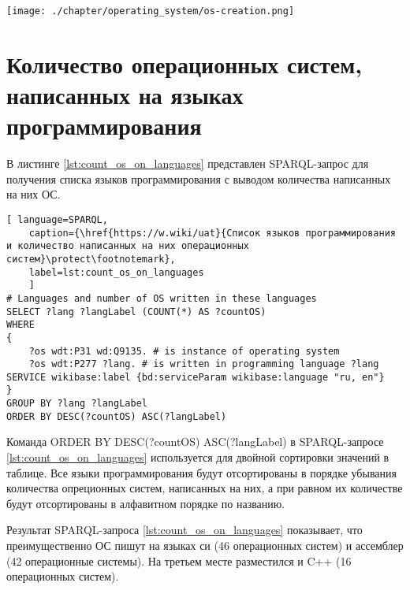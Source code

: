 \begin{figure*}[h!]
	\texttt{[image: ./chapter/operating\_system/os-creation.png]}
	\caption{Часть временной шкалы с датами выпуска операционных систем с 1955 по 2020 год.}
	\label{fig:os_creation}
\end{figure*}

\section{Количество операционных систем, написанных на языках программирования}
В листинге \ref{lst:count_os_on_languages} представлен SPARQL-запрос для получения списка языков программирования с выводом количества написанных на них ОС.


\begin{lstlisting}[ language=SPARQL, 
	caption={\href{https://w.wiki/uat}{Список языков программирования и количество написанных на них операционных систем}\protect\footnotemark},
	label=lst:count_os_on_languages
	]
# Languages and number of OS written in these languages
SELECT ?lang ?langLabel (COUNT(*) AS ?countOS)
WHERE 
{
	?os wdt:P31 wd:Q9135. # is instance of operating system
	?os wdt:P277 ?lang. # is written in programming language ?lang
SERVICE wikibase:label {bd:serviceParam wikibase:language "ru, en"}
}
GROUP BY ?lang ?langLabel
ORDER BY DESC(?countOS) ASC(?langLabel)
\end{lstlisting}

Команда ORDER BY DESC(?countOS) ASC(?langLabel) в SPARQL-запросе \ref{lst:count_os_on_languages} используется для двойной сортировки значений в таблице. Все языки программирования будут отсортированы в порядке убывания количества опреционных систем, написанных на них, а при равном их количестве будут отсортированы в алфавитном порядке по названию.

Результат SPARQL-запроса \ref{lst:count_os_on_languages} показывает, что преимущественно ОС пишут на языках си (46 операционных систем) и ассемблер (42 операционные системы). На третьем месте разместился и C++ (16 операционных систем).

